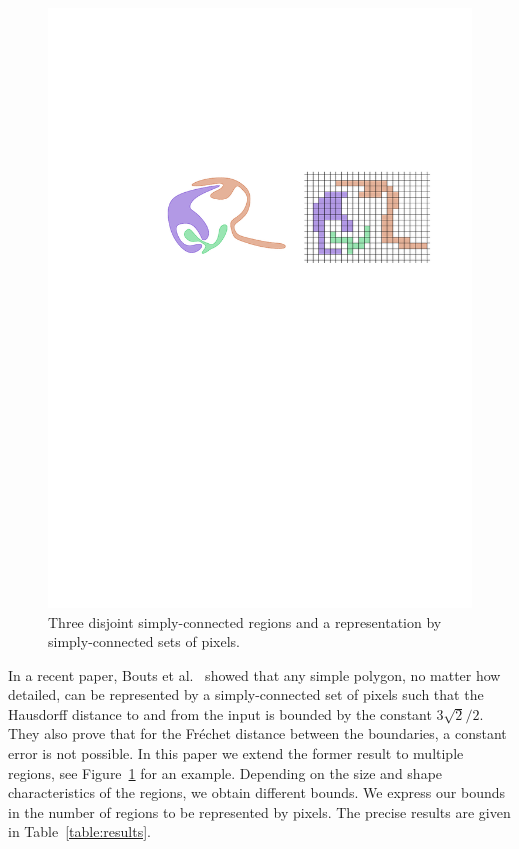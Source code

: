 \documentclass[a4paper,UKenglish,cleveref]{lipics-v2019}
\newcommand{\etal}{\textnormal{et al.}\xspace}
\begin{document}
\begin{figure}[htb]
\centering
\includegraphics[]{Figures/introfig}
\caption{Three disjoint simply-connected regions and a representation by simply-connected sets of pixels.}
\label{fig:intro}
\end{figure}

In a recent paper, Bouts \etal~\cite{bouts2016mapping} showed that any simple polygon, no matter how detailed, can be represented by a simply-connected set of pixels such that the Hausdorff distance to and from the input is bounded by the constant $3\sqrt{2}/2$. They also prove that for the Fr\'echet distance between the boundaries, a constant error is not possible.
In this paper we extend the former result to multiple regions, see Figure~\ref{fig:intro} for an example. Depending on the size and shape characteristics of the regions, we obtain different bounds. We express our bounds in the number of regions to be represented by pixels. The precise results are given in Table~\ref{table:results}.
\end{document}
